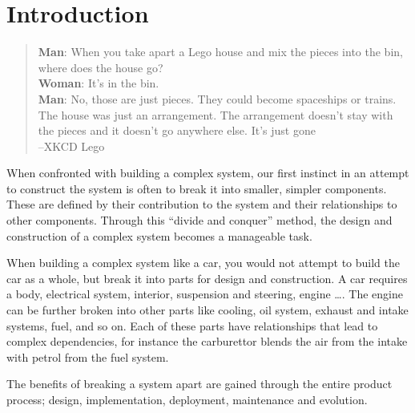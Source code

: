 \chapter{Introduction}
\label{introduction}

\begin{quotation}
\textbf{Man}: When you take apart a Lego house and mix the pieces into the bin, where does the house go?\\
\textbf{Woman}: It's in the bin.\\
\textbf{Man}: No, those are just pieces. They could become spaceships or trains. 
The house was just an arrangement. The arrangement doesn't stay with the pieces and it doesn't go anywhere else. It's just gone\\
--XKCD Lego
\end{quotation}

{}When confronted with building a complex system, our first instinct in an attempt to construct the system is often to break it into smaller, simpler components. 
{}These are defined by their contribution to the system and their relationships to other components.
{}Through this ``divide and conquer'' method, the design and construction of a complex system becomes a manageable task.

When building a complex system like a car, you would not attempt to build the car as a whole, but break it into parts for design and construction.
A car requires a body, electrical system, interior, suspension and steering, engine \ldots. 
The engine can be further broken into other parts like cooling, oil system, exhaust and intake systems, fuel, and so on.
Each of these parts have relationships that lead to complex dependencies, for instance the carburettor blends the air from the intake with petrol from the fuel system.

The benefits of breaking a system apart are gained through the entire product process; design, implementation, deployment, maintenance and evolution.


